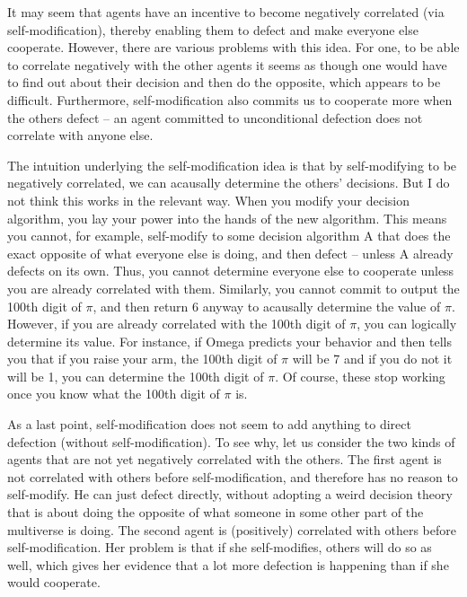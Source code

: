 It may seem that agents have an incentive to become negatively
correlated (via self-modification), thereby enabling them to defect and
make everyone else cooperate. However, there are various problems with
this idea. For one, to be able to correlate negatively with the other
agents it seems as though one would have to find out about their
decision and then do the opposite, which appears to be difficult.
Furthermore, self-modification also commits us to cooperate more when
the others defect -- an agent committed to unconditional defection does
not correlate with anyone else.

The intuition underlying the self-modification idea is that by
self-modifying to be negatively correlated, we can acausally determine
the others' decisions. But I do not think this works in the relevant
way. When you modify your decision algorithm, you lay your power into
the hands of the new algorithm. This means you cannot, for example,
self-modify to some decision algorithm A that does the exact opposite of
what everyone else is doing, and then defect -- unless A already
defects on its own. Thus, you cannot determine everyone else to
cooperate unless you are already correlated with them. Similarly, you
cannot commit to output the 100th digit of $\pi$, and then return 6 anyway
to acausally determine the value of $\pi$. However, if you are already
correlated with the 100th digit of $\pi$, you can logically determine its
value. For instance, if Omega predicts your behavior and then tells you
that if you raise your arm, the 100th digit of $\pi$ will be 7 and if you do
not it will be 1, you can determine the 100th digit of $\pi$. Of course,
these stop working once you know what the 100th digit of $\pi$ is.

As a last point, self-modification does not seem to add anything to
direct defection (without self-modification). To see why, let us
consider the two kinds of agents that are not yet negatively correlated
with the others. The first agent is not correlated with others before
self-modification, and therefore has no reason to self-modify. He can
just defect directly, without adopting a weird decision theory that is
about doing the opposite of what someone in some other part of the
multiverse is doing. The second agent is (positively) correlated with
others before self-modification. Her problem is that if she
self-modifies, others will do so as well, which gives her evidence that
a lot more defection is happening than if she would cooperate.

